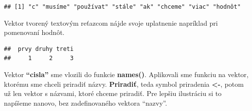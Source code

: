 \begin{Shaded}
\begin{Highlighting}[]

\StringTok{ }\NormalTok{(}\NormalTok{, }\NormalTok{, }\NormalTok{, }\NormalTok{, }\NormalTok{, }\NormalTok{,}
                       \NormalTok{, }\NormalTok{)}

\end{Highlighting}
\end{Shaded}

\begin{verbatim}
## [1] "c" "musíme" "používat" "stále" "ak" "chceme" "viac" "hodnôt"   
\end{verbatim}

Vektor tvorený textovým reťazcom nájde svoje uplatnenie napríklad pri
pomenovaní hodnôt.

\begin{Shaded}
\begin{Highlighting}[]
\StringTok{ }\NormalTok{(}\NormalTok{, }\NormalTok{, }\NormalTok{)}
\StringTok{ }\NormalTok{(}\NormalTok{, }\NormalTok{, }\NormalTok{)}


\StringTok{ }


\end{Highlighting}
\end{Shaded}

\begin{verbatim}
##  prvy druhy treti 
##     1     2     3
\end{verbatim}

Vektor \textbf{``cisla''} sme vlozili do funkcie \textbf{names()}.
Aplikovali sme funkciu na vektor, ktorému sme chceli priradiť názvy.
\textbf{Priradiť}, teda symbol priradenia \textbf{\textless-}, potom už
len vektor s názvami, ktoré chceme priradiť. Pre lepšiu ilustráciu si to
napíšeme nanovo, bez zadefinovaného vektora ``nazvy''.

